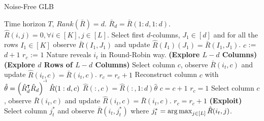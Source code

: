 \begin{algorithm}[!th]
\caption{Noise-Free GLB}
\label{alg:NFGLB}
\begin{algorithmic}
 Time horizon $T$, $Rank(\bar{R}) = d$.
 $\bar{R}_d = \bar{R}(1:d,1:d)$.
 $\hat{R}(i,j) = 0, \forall i\in[K], j\in[L]$.
\State Select first $d$-columns, $J_1 \in [d]$ and for all the rows $I_1\in[K]$ observe $\bar{R}(I_1,J_1)$ and update  $\hat{R}(I_1)(J_1) = \bar{R}(I_1,J_1)$.
\State $c$ := $d+1$
\State $r_c$ := $1$
\State Nature reveals $i_t$ in Round-Robin way.
\State {} \textbf{ (Explore $L-d$ Columns)}
\State {} \textbf{(Explore $d$ Rows of  $L-d$ Columns)}
\State Select column $c$, observe $\bar{R}(i_t,c)$ and update $\hat{R}(i_t,c) = \bar{R}(i_t,c)$.
\State $r_c = r_c + 1$
\Else
\ColRec
\State Reconstruct column $c$ with $\hat{\theta} = \left(\hat{R}_d^{\intercal}\hat{R}_d\right)^{^{\text{-}1}}\hat{R}(1:d,c) $
\State $\hat{R}(:,c) =  \hat{R}(:,1:d)\hat{\theta}$
\State $c = c + 1$
\State $r_c = 1$
\EndColRec
\State Select column $c$, observe $\bar{R}(i_t,c)$ and update $\hat{R}(i_t,c)=\bar{R}(i_t,c)$.
\State $r_c = r_c + 1$
\EndIf
\Else
\State \textbf{(Exploit)} Select column $j_t^*$ and observe $\bar{R}(i_t,j_t^*)$ where $j_t^* = \mathop{\rm arg\,max}_{j\in[L]} {\hat{R}(i_t,j)}$.
\EndIf
\EndFor
\end{algorithmic}
\end{algorithm}


